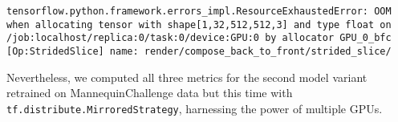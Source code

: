 \begin{lstlisting}[breaklines]
    tensorflow.python.framework.errors_impl.ResourceExhaustedError: OOM when allocating tensor with shape[1,32,512,512,3] and type float on /job:localhost/replica:0/task:0/device:GPU:0 by allocator GPU_0_bfc [Op:StridedSlice] name: render/compose_back_to_front/strided_slice/
\end{lstlisting}

Nevertheless, we computed all three metrics for the second model variant retrained on MannequinChallenge data but this time with \texttt{tf.distribute.MirroredStrategy}, harnessing the power of multiple GPUs.

